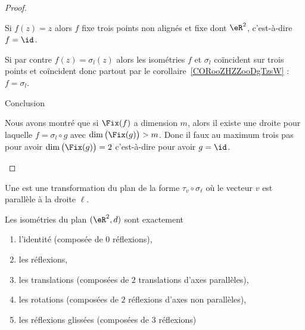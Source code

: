 \begin{proof}
\begin{subproof}
            Si \( f(z)=z\) alors \( f\) fixe trois points non alignés et fixe dont \( \eR^2\), c'est-à-dire \( f=\id\).

            Si par contre \( f(z)=\sigma_l(z)\) alors les isométries \( f\) et \( \sigma_l\) coïncident sur trois points et coïncident donc partout par le corollaire~\ref{CORooZHZZooDgTzsW} : \( f=\sigma_l\).
        \item[Conclusion]

            Nous avons montré que si \( \Fix(f)\) a dimension \( m\), alors il existe une droite pour laquelle \( f=\sigma_l\circ g\) avec \( \dim\big( \Fix(g) \big)>m\). Donc il faux au maximum trois pas pour avoir \( \dim\big( \Fix(g) \big)=2\) c'est-à-dire pour avoir \( g=\id\).
    \end{subproof}
\end{proof}

\begin{definition}      \label{DEFooJEOYooNwYtuQ}
    Une  est une transformation du plan de la forme \( \tau_v\circ\sigma_{\ell}\) où le vecteur \( v\) est parallèle à la droite \( \ell\).
\end{definition}

\begin{theorem}      \label{THOooVRNOooAgaVRN}
    Les isométries du plan \( (\eR^2,d)\) sont exactement
    \begin{enumerate}
        \item
            l'identité (composée de \( 0\) réflexions),
        \item
            les réflexions,
        \item
            les translations (composées de \( 2\) translations d'axes parallèles),
        \item
            les rotations (composées de \( 2\) réflexions d'axes non parallèles),
        \item
            les réflexions glissées (composées de \( 3\) réflexions)
    \end{enumerate}
\end{theorem}

